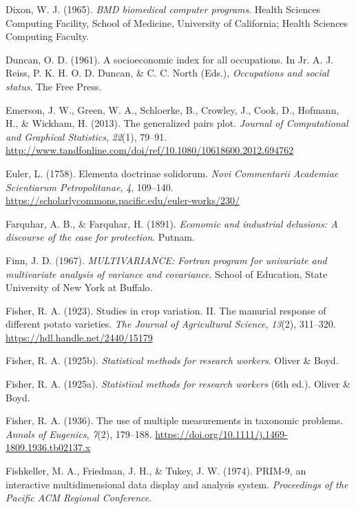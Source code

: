 \documentclass[
  letterpaper,
  10pt,
  krantz2]{krantz}
\newlength{\cslhangindent}
\newenvironment{CSLReferences}[2] %
 {\begin{list}{}{%
  \setlength{\itemindent}{0pt}
  \setlength{\leftmargin}{0pt}
  \setlength{\parsep}{0pt}
  \ifodd #1
   \setlength{\leftmargin}{\cslhangindent}
   \setlength{\itemindent}{-1\cslhangindent}
  \fi
  \setlength{\itemsep}{#2\baselineskip}}}
 {\end{list}}
\begin{document}
\begin{CSLReferences}{1}{0}
Dixon, W. J. (1965). \emph{BMD biomedical computer programs}. Health
Sciences Computing Facility, School of Medicine, University of
California; Health Sciences Computing Faculty.

Duncan, O. D. (1961). A socioeconomic index for all occupations. In Jr.
A. J. Reiss, P. K. H. O. D. Duncan, \& C. C. North (Eds.),
\emph{Occupations and social status}. The Free Press.

Emerson, J. W., Green, W. A., Schloerke, B., Crowley, J., Cook, D.,
Hofmann, H., \& Wickham, H. (2013). The generalized pairs plot.
\emph{Journal of Computational and Graphical Statistics}, \emph{22}(1),
79--91.
\url{http://www.tandfonline.com/doi/ref/10.1080/10618600.2012.694762}

Euler, L. (1758). Elementa doctrinae solidorum. \emph{Novi Commentarii
Academiae Scientiarum Petropolitanae}, \emph{4}, 109--140.
\url{https://scholarlycommons.pacific.edu/euler-works/230/}

Farquhar, A. B., \& Farquhar, H. (1891). \emph{Economic and industrial
delusions: A discourse of the case for protection}. Putnam.

Finn, J. D. (1967). \emph{{MULTIVARIANCE}: Fortran program for
univariate and multivariate analysis of variance and covariance}. School
of Education, State University of New York at Buffalo.

Fisher, R. A. (1923). Studies in crop variation. II. The manurial
response of different potato varieties. \emph{The Journal of
Agricultural Science}, \emph{13}(2), 311--320.
\url{https://hdl.handle.net/2440/15179}

Fisher, R. A. (1925b). \emph{Statistical methods for research workers}.
Oliver \& Boyd.

Fisher, R. A. (1925a). \emph{Statistical methods for research workers}
(6th ed.). Oliver \& Boyd.

Fisher, R. A. (1936). The use of multiple measurements in taxonomic
problems. \emph{Annals of Eugenics}, \emph{7}(2), 179--188.
\url{https://doi.org/10.1111/j.1469-1809.1936.tb02137.x}

Fishkeller, M. A., Friedman, J. H., \& Tukey, J. W. (1974). {PRIM-9}, an
interactive multidimensional data display and analysis system.
\emph{Proceedings of the Pacific ACM Regional Conference}.


\end{CSLReferences}
\end{document}
